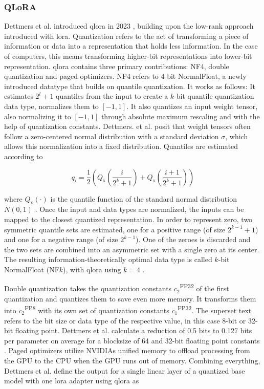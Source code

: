\subsubsection{QLoRA}
\label{sec:qlora}
Dettmers et al. introduced \ac{qlora} in 2023 \cite{Dettmers.2023}, building upon the low-rank approach introduced with \ac{lora}.
Quantization refers to the act of transforming a piece of information or data into a representation that holds less information.
In the case of computers, this means transforming higher-bit representations into lower-bit representation.
\ac{qlora} contains three primary contributions: NF4, double quantization and paged optimizers.
NF4 refers to 4-bit NormalFloat, a newly introduced datatype that builds on quantile quantization.
It works as follows:
It estimates $2^l+1$ quantiles from the input to create a $k$-bit quantile quantization data type, normalizes them to $[-1,1]$.
It also quantizes an input weight tensor, also normalizing it to $[-1,1]$ through absolute maximum rescaling and with the help of quantization constants.
Dettmers. et al. posit that weight tensors often follow a zero-centered normal distribution with a standard deviation $\sigma$, which allows this normalization into a fixed distribution.
Quantiles are estimated according to

\begin{equation}
    q_i = \frac{1}{2} \left( Q_{\mathrm{x}} \left( \frac{i}{2^k+1} \right) + Q_{\mathrm{x}} \left( \frac{i+1}{2^k+1} \right) \right)
\end{equation}

where $Q_{\mathrm{x}}(\cdot)$ is the quantile function of the standard normal distribution $N(0,1)$ \cite{Dettmers.2023}.
Once the input and data types are normalized, the inputs can be mapped to the closest quantized representation.
In order to represent zero, two symmetric quantile sets are estimated, one for a positive range (of size $2^{k-1}+1$) and one for a negative range (of size $2^{k-1}$).
One of the zeroes is discarded and the two sets are combined into an asymmetric set with a single zero at its center.
The resulting information-theoretically optimal data type is called $k$-bit NormalFloat (NF$k$), with \ac{qlora} using $k=4$ \cite{Dettmers.2023}.

Double quantization takes the quantization constants $c_2$\textsuperscript{FP32} of the first quantization and quantizes them to save even more memory.
It transforms them into $c_2$\textsuperscript{FP8} with its own set of quantization constants $c_1$\textsuperscript{FP32}.
The superset text refers to the bit size or data type of the respective value, in this case 8-bit or 32-bit floating point.
Dettmers et al. calculate a reduction of 0.5 bits to 0.127 bits per parameter on average for a blocksize of 64 and 32-bit floating point constants \cite{Dettmers.2023}.
Paged optimizers utilize NVIDIAs unified memory to offload processing from the GPU to the CPU when the GPU runs out of memory.
Combining everything, Dettmers et al. define the output for a single linear layer of a quantized base model with one \ac{lora} adapter using \ac{qlora} as

